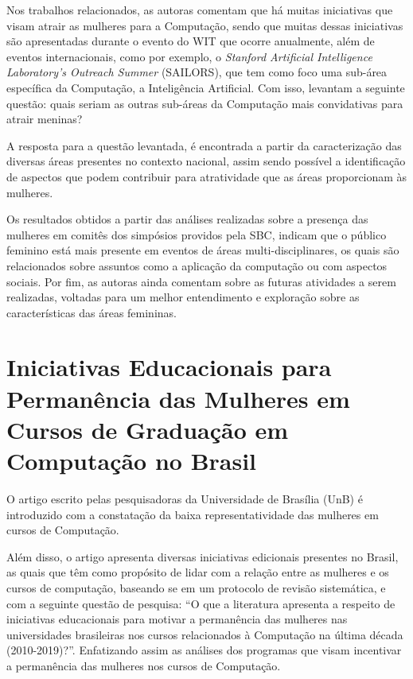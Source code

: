 Nos trabalhos relacionados, as autoras comentam que há muitas iniciativas que visam atrair as mulheres para a Computação, sendo que muitas dessas iniciativas são apresentadas durante o evento do WIT que ocorre anualmente, além de eventos internacionais, como por exemplo, o \textit{Stanford Artificial Intelligence Laboratory’s Outreach Summer} (SAILORS), que tem como foco uma sub-área específica da Computação, a Inteligência Artificial. Com isso, levantam a seguinte questão: quais seriam as outras sub-áreas da Computação mais convidativas para atrair meninas?

A resposta para a questão levantada, é encontrada a partir da caracterização das diversas áreas presentes no contexto nacional, assim sendo possível a identificação de aspectos que podem contribuir para atratividade que as áreas proporcionam às mulheres. 

Os resultados obtidos a partir das análises realizadas sobre a presença das mulheres em comitês dos simpósios providos pela SBC, indicam que o público feminino está mais presente em eventos de áreas multi-disciplinares, os quais são relacionados sobre assuntos como a aplicação da computação ou com aspectos sociais. Por fim, as autoras ainda comentam sobre as futuras atividades a serem realizadas, voltadas para um melhor entendimento e exploração sobre as características das áreas femininas. 


\section{Iniciativas Educacionais para Permanência das Mulheres em Cursos de Graduação em Computação no Brasil}\label{sec:IniciativasPermanencia}

O artigo escrito pelas pesquisadoras  da Universidade de Brasília (UnB) é introduzido com a constatação da baixa representatividade das mulheres em cursos de Computação.


Além disso, o artigo apresenta diversas iniciativas edicionais presentes no Brasil, as quais que têm como propósito de lidar com a relação entre as mulheres e os cursos de computação, baseando se em um protocolo de revisão sistemática, e com a seguinte questão de pesquisa: “O que a literatura apresenta a respeito de iniciativas educacionais para motivar a permanência das mulheres nas universidades brasileiras nos cursos relacionados à Computação na última década (2010-2019)?”. Enfatizando assim as análises dos programas que visam incentivar a permanência das mulheres nos cursos de Computação.

